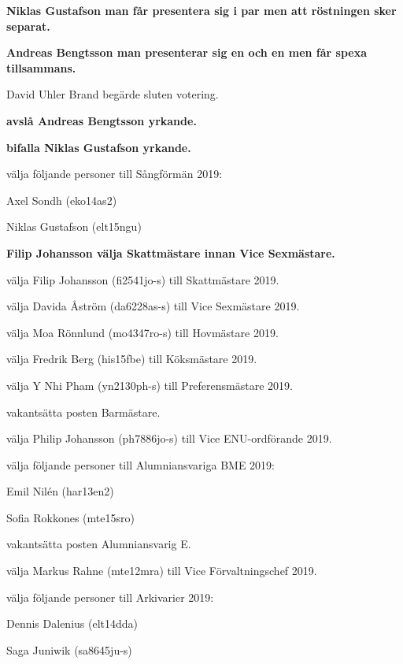 \documentclass[10pt]{article}
\begin{document}
\begin{paragrafer}
\begin{paralist}
    \textbf{\Mbaby}

    \textbf{Niklas Gustafson \ypa man får presentera sig i par men att röstningen sker separat.}

    \textbf{Andreas Bengtsson \ypa man presenterar sig en och en men får spexa tillsammans.}

    David Uhler Brand begärde sluten votering.

    \textbf{\Mba avslå Andreas Bengtsson yrkande.}

    \textbf{\Mba bifalla Niklas Gustafson yrkande.}

    \Mba välja följande personer till Sångförmän 2019:
    \begin{tightdashlist}
        \item Axel Sondh (eko14as2)
        \item Niklas Gustafson (elt15ngu)
    \end{tightdashlist}

    \textbf{Filip Johansson \ypa välja Skattmästare innan Vice Sexmästare.}

    \textbf{\Mbaby}

    \Mba välja Filip Johansson (fi2541jo-s) till Skattmästare 2019.

    \Mba välja Davida Åström (da6228as-s) till Vice Sexmästare 2019.

    \Mba välja Moa Rönnlund (mo4347ro-s) till Hovmästare 2019.

    \Mba välja Fredrik Berg (his15fbe) till Köksmästare 2019.

    \Mba välja Y Nhi Pham (yn2130ph-s) till Preferensmästare 2019.

    \Mba vakantsätta posten Barmästare.

    \Mba välja Philip Johansson (ph7886jo-s) till Vice ENU-ordförande 2019.

    \Mba välja följande personer till Alumniansvariga BME 2019:
    \begin{tightdashlist}
      \item Emil Nilén (har13en2)
      \item Sofia Rokkones (mte15sro)
    \end{tightdashlist}

    \Mba vakantsätta posten Alumniansvarig E.

    \Mba välja Markus Rahne (mte12mra) till Vice Förvaltningschef 2019.

    \Mba välja följande personer till Arkivarier 2019:
    \begin{tightdashlist}
        \item Dennis Dalenius (elt14dda)
        \item Saga Juniwik (sa8645ju-s)
    \end{tightdashlist}


\end{paralist}
\end{paragrafer}
\end{document}
